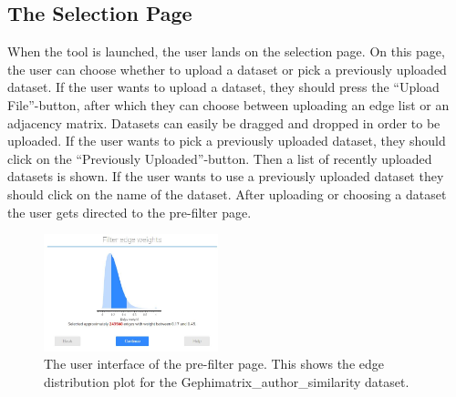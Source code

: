 \documentclass[journal]{vgtc}                %
\begin{document}
\subsection{The Selection Page} %
When the tool is launched, the user lands on the selection page. On this page, the user can choose whether to upload a dataset or pick a previously uploaded dataset. If the user wants to upload a dataset, they should press the ``Upload File''-button, after which they can choose between uploading an edge list or an adjacency matrix. Datasets can easily be dragged and dropped in order to be uploaded. If the user wants to pick a previously uploaded dataset, they should click on the ``Previously Uploaded''-button. Then a list of recently uploaded datasets is shown. If the user wants to use a previously uploaded dataset they should click on the name of the dataset. After uploading or choosing a dataset the user gets directed to the pre-filter page.

\begin{figure}[hbt]
    \centering
    \includegraphics[width=0.45\textwidth]{Distplot.JPG}
    \caption{The user interface of the pre-filter page. This shows the edge distribution plot for the Gephimatrix\_author\_similarity dataset.}
    \label{fig:UISelect}
\end{figure}
\end{document}
